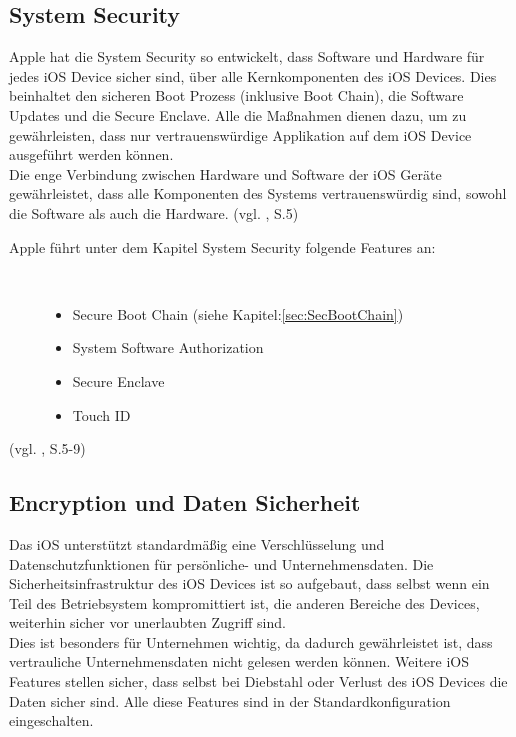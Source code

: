 \subsection{System Security}
\label{sec:SystemSec}
Apple hat die System Security so entwickelt, dass Software und Hardware für
jedes iOS Device sicher sind, über alle Kernkomponenten des iOS Devices.
Dies beinhaltet den sicheren Boot Prozess (inklusive Boot Chain), die Software
Updates und die \glqq Secure Enclave\grqq. Alle die Maßnahmen dienen dazu, um
zu gewährleisten, dass nur \glqq vertrauenswürdige Applikation \grqq{} auf dem
iOS Device ausgeführt werden können.\\
Die enge Verbindung zwischen Hardware und Software der iOS Geräte
gewährleistet, dass alle Komponenten des Systems \glqq vertrauenswürdig\grqq{}
sind, sowohl die Software als auch die Hardware.
 (vgl. \cite{Apple[4]}, S.5)
\begin{description}
\item[Apple führt unter dem Kapitel \glqq System Security\grqq{}  folgende
Features an:]~\par
	\begin{itemize}
		\item Secure Boot Chain (siehe Kapitel:\ref{sec:SecBootChain})
 		\item System Software Authorization
 		\item Secure Enclave
 		\item Touch ID
        \end{itemize}
\end{description}
(vgl. \cite{Apple[4]}, S.5-9)

\subsection{Encryption und Daten Sicherheit}
Das iOS unterstützt standardmäßig eine Verschlüsselung und
Datenschutzfunktionen für persönliche- und Unternehmensdaten.
Die Sicherheitsinfrastruktur des iOS Devices ist so aufgebaut, dass selbst wenn
ein Teil des Betriebsystem kompromittiert ist, die anderen Bereiche des
Devices, weiterhin sicher vor unerlaubten Zugriff sind. \\
Dies ist besonders für Unternehmen wichtig, da dadurch gewährleistet ist, dass
vertrauliche Unternehmensdaten nicht gelesen werden können. Weitere iOS
Features stellen sicher, dass selbst bei Diebstahl oder Verlust des iOS Devices
die Daten sicher sind.
Alle diese Features sind in der Standardkonfiguration eingeschalten.

